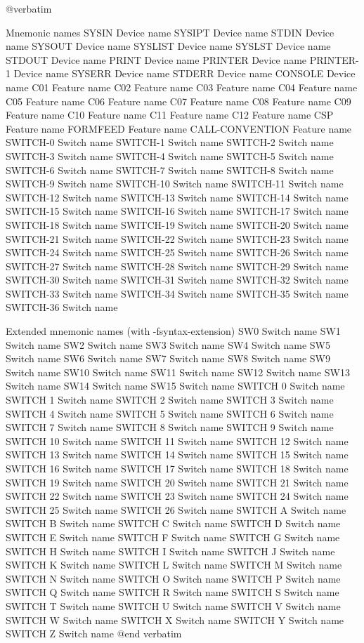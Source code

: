 @verbatim

Mnemonic names
SYSIN		Device name
SYSIPT		Device name
STDIN		Device name
SYSOUT		Device name
SYSLIST		Device name
SYSLST		Device name
STDOUT		Device name
PRINT		Device name
PRINTER		Device name
PRINTER-1	Device name
SYSERR		Device name
STDERR		Device name
CONSOLE		Device name
C01		Feature name
C02		Feature name
C03		Feature name
C04		Feature name
C05		Feature name
C06		Feature name
C07		Feature name
C08		Feature name
C09		Feature name
C10		Feature name
C11		Feature name
C12		Feature name
CSP		Feature name
FORMFEED	Feature name
CALL-CONVENTION	Feature name
SWITCH-0	Switch name
SWITCH-1	Switch name
SWITCH-2	Switch name
SWITCH-3	Switch name
SWITCH-4	Switch name
SWITCH-5	Switch name
SWITCH-6	Switch name
SWITCH-7	Switch name
SWITCH-8	Switch name
SWITCH-9	Switch name
SWITCH-10	Switch name
SWITCH-11	Switch name
SWITCH-12	Switch name
SWITCH-13	Switch name
SWITCH-14	Switch name
SWITCH-15	Switch name
SWITCH-16	Switch name
SWITCH-17	Switch name
SWITCH-18	Switch name
SWITCH-19	Switch name
SWITCH-20	Switch name
SWITCH-21	Switch name
SWITCH-22	Switch name
SWITCH-23	Switch name
SWITCH-24	Switch name
SWITCH-25	Switch name
SWITCH-26	Switch name
SWITCH-27	Switch name
SWITCH-28	Switch name
SWITCH-29	Switch name
SWITCH-30	Switch name
SWITCH-31	Switch name
SWITCH-32	Switch name
SWITCH-33	Switch name
SWITCH-34	Switch name
SWITCH-35	Switch name
SWITCH-36	Switch name

Extended mnemonic names (with -fsyntax-extension)
SW0		Switch name
SW1		Switch name
SW2		Switch name
SW3		Switch name
SW4		Switch name
SW5		Switch name
SW6		Switch name
SW7		Switch name
SW8		Switch name
SW9		Switch name
SW10		Switch name
SW11		Switch name
SW12		Switch name
SW13		Switch name
SW14		Switch name
SW15		Switch name
SWITCH 0	Switch name
SWITCH 1	Switch name
SWITCH 2	Switch name
SWITCH 3	Switch name
SWITCH 4	Switch name
SWITCH 5	Switch name
SWITCH 6	Switch name
SWITCH 7	Switch name
SWITCH 8	Switch name
SWITCH 9	Switch name
SWITCH 10	Switch name
SWITCH 11	Switch name
SWITCH 12	Switch name
SWITCH 13	Switch name
SWITCH 14	Switch name
SWITCH 15	Switch name
SWITCH 16	Switch name
SWITCH 17	Switch name
SWITCH 18	Switch name
SWITCH 19	Switch name
SWITCH 20	Switch name
SWITCH 21	Switch name
SWITCH 22	Switch name
SWITCH 23	Switch name
SWITCH 24	Switch name
SWITCH 25	Switch name
SWITCH 26	Switch name
SWITCH A	Switch name
SWITCH B	Switch name
SWITCH C	Switch name
SWITCH D	Switch name
SWITCH E	Switch name
SWITCH F	Switch name
SWITCH G	Switch name
SWITCH H	Switch name
SWITCH I	Switch name
SWITCH J	Switch name
SWITCH K	Switch name
SWITCH L	Switch name
SWITCH M	Switch name
SWITCH N	Switch name
SWITCH O	Switch name
SWITCH P	Switch name
SWITCH Q	Switch name
SWITCH R	Switch name
SWITCH S	Switch name
SWITCH T	Switch name
SWITCH U	Switch name
SWITCH V	Switch name
SWITCH W	Switch name
SWITCH X	Switch name
SWITCH Y	Switch name
SWITCH Z	Switch name
@end verbatim

